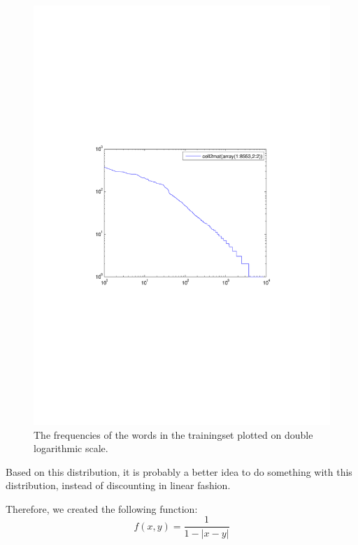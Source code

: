 \documentclass[a4paper]{article}
\begin{document}
\begin{figure}
\centering
\includegraphics{zipfLaw.pdf}
\caption{The frequencies of the words in the trainingset plotted on double logarithmic scale.}
\label{fig:ZipfDistribution}
\end{figure}

Based on this distribution, it is probably a better idea to do something with this distribution, instead of discounting in linear fashion.

Therefore, we created the following function:
$$f(x,y) = \frac{1}{1-|x-y|}$$
\end{document}
